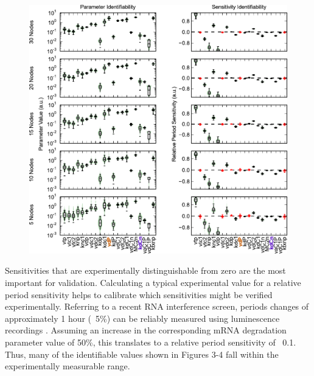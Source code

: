 \begin{figure}[h]
  \centering
  \includegraphics{chap3/figures/fig4.pdf}
  \label{fig:3_4}
\end{figure}

Sensitivities that are experimentally distinguishable from zero are the most
important for validation. Calculating a typical experimental value for a
relative period sensitivity helps to calibrate which sensitivities might be
verified experimentally. Referring to a recent RNA interference screen, periods
changes of approximately 1 hour (~5\%) can be reliably measured using
luminescence recordings \cite{Zhang2009}. Assuming an increase in the corresponding mRNA
degradation parameter value of 50\%, this translates to a relative period
sensitivity of ~0.1. Thus, many of the identifiable values shown in Figures 3-4
fall within the experimentally measurable range. 

